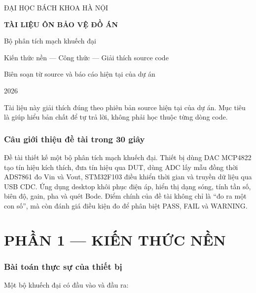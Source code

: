 \documentclass[12pt,a4paper,oneside]{article}
\begin{document}
\begin{titlepage}
\centering
\vspace*{2.0cm}
{\Large ĐẠI HỌC BÁCH KHOA HÀ NỘI\par}
\vspace{2.2cm}
{\Huge\bfseries\color{guideblue} TÀI LIỆU ÔN BẢO VỆ ĐỒ ÁN\par}
\vspace{0.8cm}
{\LARGE Bộ phân tích mạch khuếch đại\par}
\vspace{1.5cm}
{\large Kiến thức nền — Công thức — Giải thích source code\par}
\vfill
{\large Biên soạn từ source và báo cáo hiện tại của dự án\par}
\vspace{0.8cm}
{\large 2026\par}
\end{titlepage}

\tableofcontents
\clearpage
{}

Tài liệu này giải thích đúng theo phiên bản source hiện tại của dự án. Mục tiêu là giúp hiểu bản chất để tự trả lời, không phải học thuộc từng dòng code.

\section{Câu giới thiệu đề tài trong 30 giây}

Đề tài thiết kế một bộ phân tích mạch khuếch đại. Thiết bị dùng DAC MCP4822 tạo tín hiệu kích thích, đưa tín hiệu qua DUT, dùng ADC lấy mẫu đồng thời ADS7861 đo Vin và Vout, STM32F103 điều khiển thời gian và truyền dữ liệu qua USB CDC. Ứng dụng desktop khôi phục điện áp, hiển thị dạng sóng, tính tần số, biên độ, gain, pha và quét Bode. Điểm chính của đề tài không chỉ là “đo ra một con số”, mà còn đánh giá điều kiện đo để phân biệt PASS, FAIL và WARNING.

\clearpage

\clearpage
\part{PHẦN 1 — KIẾN THỨC NỀN}
\setcounter{section}{0}

\section{Bài toán thực sự của thiết bị}

Một bộ khuếch đại có đầu vào và đầu ra:
\end{document}
